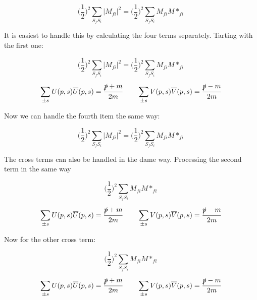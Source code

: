 \documentclass[a4]{article}
\begin{document}
    \begin{equation}
        \bigg( \frac{1}{2} \bigg)^2 \sum_{S_f S_i} |M_{f i}|^2 = \bigg( \frac{1}{2} \bigg)^2 \sum_{S_f S_i} M_{fi} M*_{fi}
    \end{equation}

    It is easiest to handle this by calculating the four terms separately. Tarting with the first one:

    \begin{equation}
        \bigg( \frac{1}{2} \bigg)^2 \sum_{S_f S_i} |M_{f i}|^2 = \bigg( \frac{1}{2} \bigg)^2 \sum_{S_f S_i} M_{fi} M*_{fi}
    \end{equation}

    \begin{equation}
        \sum_{\pm s} U (p, s) \overline{U} (p, s) = \frac{\slashed{p} + m}{2m} \qquad \sum_{\pm s} V (p, s) \overline{V} (p, s) = \frac{\slashed{p} - m}{2m}
    \end{equation}

    Now we can handle the fourth item the same way:

    \begin{equation}
        \bigg( \frac{1}{2} \bigg)^2 \sum_{S_f S_i} |M_{f i}|^2 = \bigg( \frac{1}{2} \bigg)^2 \sum_{S_f S_i} M_{fi} M*_{fi}
    \end{equation}

    The cross terms can also be handled in the dame way. Processing the second term in the same way

    \begin{equation}
        \bigg( \frac{1}{2} \bigg)^2 \sum_{S_f S_i} M_{fi} M*_{fi}
    \end{equation}

    \begin{equation}
        \sum_{\pm s} U (p, s) \overline{U} (p, s) = \frac{\slashed{p} + m}{2m} \qquad \sum_{\pm s} V (p, s) \overline{V} (p, s) = \frac{\slashed{p} - m}{2m}
    \end{equation}

    Now for the other cross term:

    \begin{equation}
        \bigg( \frac{1}{2} \bigg)^2 \sum_{S_f S_i} M_{fi} M*_{fi}
    \end{equation}

    \begin{equation}
        \sum_{\pm s} U (p, s) \overline{U} (p, s) = \frac{\slashed{p} + m}{2m} \qquad \sum_{\pm s} V (p, s) \overline{V} (p, s) = \frac{\slashed{p} - m}{2m}
    \end{equation}
\end{document}
